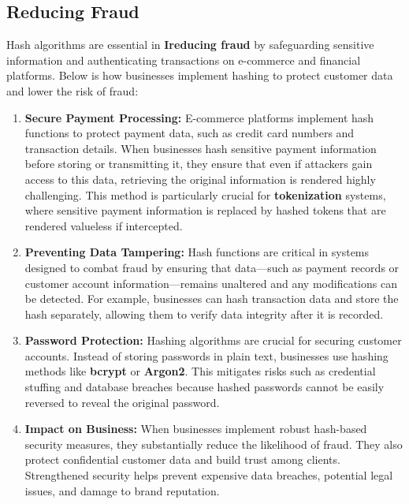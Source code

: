\documentclass[11pt,a4paper]{article}
\begin{document}
    \subsection*{Reducing Fraud}
    Hash algorithms are essential in \textbf{Ireducing fraud} by safeguarding sensitive information and authenticating transactions on e-commerce and financial platforms. Below is how businesses implement hashing to protect customer data and lower the risk of fraud:

    \begin{enumerate}
        \item \textbf{Secure Payment Processing:}
        \newline
        E-commerce platforms implement hash functions to protect payment data, such as credit card numbers and transaction details. When businesses hash sensitive payment information before storing or transmitting it, they ensure that even if attackers gain access to this data, retrieving the original information is rendered highly challenging. This method is particularly crucial for \textbf{tokenization} systems, where sensitive payment information is replaced by hashed tokens that are rendered valueless if intercepted.

        \item \textbf{Preventing Data Tampering:}
        \newline
        Hash functions are critical in systems designed to combat fraud by ensuring that data—such as payment records or customer account information—remains unaltered and any modifications can be detected. For example, businesses can hash transaction data and store the hash separately, allowing them to verify data integrity after it is recorded.

        \item \textbf{Password Protection:}
        \newline
        Hashing algorithms are crucial for securing customer accounts. Instead of storing passwords in plain text, businesses use hashing methods like \textbf{bcrypt} or \textbf{Argon2}. This mitigates risks such as credential stuffing and database breaches because hashed passwords cannot be easily reversed to reveal the original password.

        \item \textbf{Impact on Business:}
        \newline
        When businesses implement robust hash-based security measures, they substantially reduce the likelihood of fraud. They also protect confidential customer data and build trust among clients. Strengthened security helps prevent expensive data breaches, potential legal issues, and damage to brand reputation.

    \end{enumerate}
\end{document}
